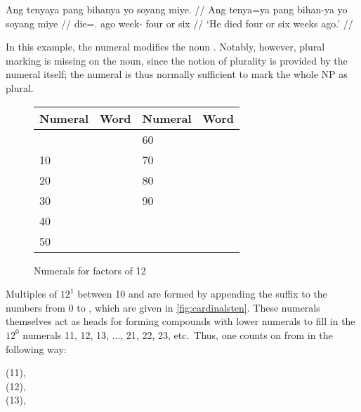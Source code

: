 \ex\label{ex:nummod}
\begingl
	\gla Ang tenyaya pang bihanya yo soyang miye. //
	\glb Ang tenya=ya pang bihan-ya yo soyang miye //
	\glc \AgtT{} die=\TsgM{}.\Top{} ago week-\Loc{} four or six //
	\glft `He died four or six weeks ago.' //
\endgl
\xe

In this example, the numeral  modifies the noun 
. Notably, however, plural marking is missing on the 
noun, since the notion of plurality is provided by the numeral itself; the 
numeral is thus normally sufficient to mark the whole NP as plural.

\begin{figure}[tp]\centering
\caption{Numerals for factors of 12}
\begin{tabu} to .75\linewidth {X[1c] X[2c] X[1c] X[2c]}
\toprule\tableheaderfont
Numeral
	& Word
	& Numeral
	& Word
	\\
\toprule

&
& 60 &  \\

10 & 
& 70 &  \\

20 &   
& 80 &  \\

30 & 
& 90 &  \\

40 & 
&  &  \\

50 & 
&  &  \\

\bottomrule
\end{tabu}
\label{fig:cardinalsten}
\end{figure}

Multiples of $12^1$ between 10 and  are formed by appending the 
suffix  to the numbers from 0 to \elv, which are given in 
\autoref{fig:cardinalsten}. These numerals themselves act as heads for forming 
compounds with lower numerals to fill in the $12^0$ numerals 11, 12, 13, ..., 
21, 22, 23, etc.\ Thus, one counts on from  in the 
following way:

\pex
\a %
	 (11), \\
	 (12), \\
	 (13),  \medskip
	
